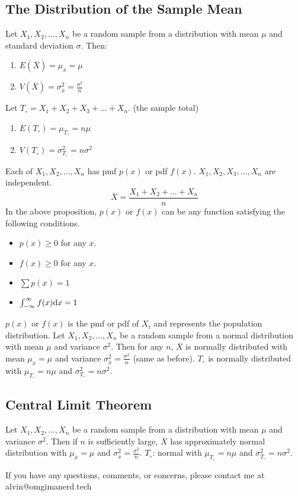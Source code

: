 \documentclass[letterpaper, 12pt]{math}
\begin{document}
\subsection*{The Distribution of the Sample Mean}
Let \( X_{1},X_{2},\dots,X_{n} \) be a random sample from a distribution with
mean \( \mu \) and standard deviation \( \sigma \). Then:
\begin{enumerate}
  \item \( E(\overline{X}) = \mu_{\overline{x}} = \mu \)
  \item \( V(\overline{X}) = \sigma_{\overline{x}}^{2} = \frac{\sigma^{2}}{n} \)
\end{enumerate}
Let \( T_{\circ} = X_{1}+X_{2}+X_{3}+\dots+X_{n} \). (the sample total)
\begin{enumerate}
  \item \( E(T_{\circ}) = \mu_{T_{\circ}} = n\mu \)
  \item \( V(T_{\circ}) = \sigma_{T_{\circ}}^{2} = n\sigma^{2} \)
\end{enumerate}
Each of \( X_{1},X_{2},\dots,X_{n} \) has pmf \( p(x) \) or pdf \( f(x) \).
\( X_{1},X_{2},X_{3},\dots,X_{n} \) are independent.
\[ \overline{X} = \frac{X_{1}+X_{2}+\dots+X_{n}}{n} \]
In the above proposition, \( p(x) \) or \( f(x) \) can be any function
satisfying the following conditions.
\begin{itemize}
  \item \( p(x)\geq 0 \) for any \( x \).
  \item \( f(x)\geq 0 \) for any \( x \).
  \item \( \sum p(x) = 1 \)
  \item \( \int_{-\infty}^{\infty}f(x)\mathrm{d}{x} = 1 \)
\end{itemize}
\( p(x) \) or \( f(x) \) is the pmf or pdf of \( X_{i} \) and represents the
population distribution. Let \( X_{1},X_{2},\dots,X_{n} \) be a random
sample from a normal distribution with mean \( \mu \) and variance
\( \sigma^{2} \). Then for any \( n \), \( \overline{X} \) is normally
distributed with mean \( \mu_{\overline{x}} = \mu \) and variance
\( \sigma_{\overline{x}}^{2} = \frac{\sigma^{2}}{n} \) (same as before).
\( T_{\circ} \) is normally distributed with \( \mu_{T_{\circ}} = n\mu \)
and \( \sigma_{T_{\circ}}^{2} = n\sigma^{2} \).

\subsection*{Central Limit Theorem}
Let \( X_{1},X_{2},\dots,X_{n} \) be a random sample from a distribution
with mean \( \mu \) and variance \( \sigma^{2} \). Then if \( n \) is
sufficiently large, \( \overline{X} \) has approximately normal distribution
with \( \mu_{\overline{x}} = \mu \) and \( \sigma_{\overline{x}}^{2} =
\frac{\sigma^{2}}{n} \). \( T_{\circ} \): normal with \( \mu_{T_{\circ}} =
n\mu \) and \( \sigma_{T_{\circ}}^{2} = n\sigma^{2} \).

\begin{center}
  If you have any questions, comments, or concerns, please contact me at
  alvin@omgimanerd.tech
\end{center}
\end{document}
